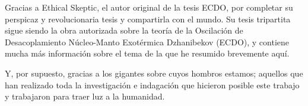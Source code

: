 \documentclass[10pt,twocolumn,letterpaper]{article}
\begin{document}
Gracias a Ethical Skeptic, el autor original de la tesis ECDO, por completar su perspicaz y revolucionaria tesis y compartirla con el mundo. Su tesis tripartita \cite{1} sigue siendo la obra autorizada sobre la teoría de la Oscilación de Desacoplamiento Núcleo-Manto Exotérmica Dzhanibekov (ECDO), y contiene mucha más información sobre el tema de la que he resumido brevemente aquí.

Y, por supuesto, gracias a los gigantes sobre cuyos hombros estamos; aquellos que han realizado toda la investigación e indagación que hicieron posible este trabajo y trabajaron para traer luz a la humanidad.

\clearpage
\twocolumn

{\small
\renewcommand{\refname}{References}


}
\end{document}
